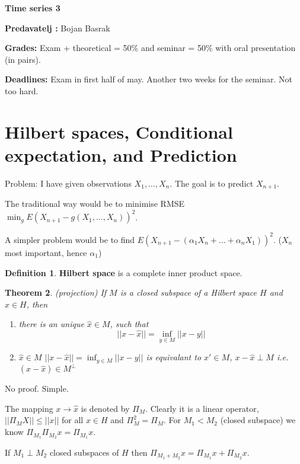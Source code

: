 \documentclass[12pt,a4paper]{amsart}
\theoremstyle{definition} %
\newtheorem{defn}{Definition}[section]
\theoremstyle{plain} %
\newtheorem{theorem}[defn]{Theorem}
\begin{document}
{\bf \huge Time series 3}

\vskip1cm

{\bf Predavatelj : } Bojan Basrak


{\bf Grades: } Exam + theoretical = 50\% and seminar = 50\% with oral presentation (in pairs).

{\bf Deadlines: } Exam in first half of may. Another two weeks for the seminar. Not too hard.

\section{Hilbert spaces, Conditional expectation, and Prediction}

\vskip1cm

Problem: I have given observations $X_1, \dots, X_n$. The goal is to predict $X_{n+1}$. 

The traditional way would be to minimise RMSE 
$\min_g E(X_{n+1} - g(X_1, \dots, X_n))^2$.

A simpler problem would be to find $E(X_{n+1} - (\alpha_1 X_n + \dots + \alpha_n X_1))^2$. ($X_n$ most important, hence $\alpha_1$)

\begin{defn}
{\bf Hilbert space} is a complete inner product space.
\end{defn}

\begin{theorem}(projection)
If $M$ is a closed subspace of a Hilbert space $H$ and $x \in H$, then
\begin{enumerate}
\item there is an unique $\hat{x} \in M$, such that
$$|| x - \hat{x}|| = \inf_{y \in M}|| x - y ||$$
\item $\hat{x} \in M$ $|| x - \hat{x}|| = \inf_{y \in M}|| x - y ||$ is equivalant to $x' \in M$, $x - \hat{x} \perp M$ i.e.
$(x - \hat{x}) \in M^{\perp}$
\end{enumerate}
\end{theorem}
\proof
No proof. Simple.
\endproof


The mapping $x \rightarrow \hat{x}$ is denoted by $\Pi_M$. Clearly it is a linear operator, $|| \Pi_M X|| \leq ||x||$ for all $x \in H$ and $\Pi_M^2 = \Pi_M$. For $M_1 < M_2$ (closed subspace) we know $\Pi_{M_1}\Pi_{M_2}x = \Pi_{M_1}x$.

If $M_1 \perp M_2$ closed subspaces of $H$ then $\Pi_{M_1 + M_2} x = \Pi_{M_1}x + \Pi_{M_2}x$.
\end{document}
